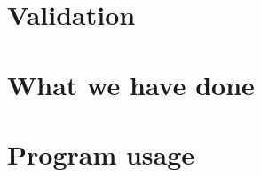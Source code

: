 \documentclass[a4paper]{scrartcl}
\begin{document}




\section{Validation}
\label{sec:val}


\section{What we have done}


\section{Program usage}
\end{document}
